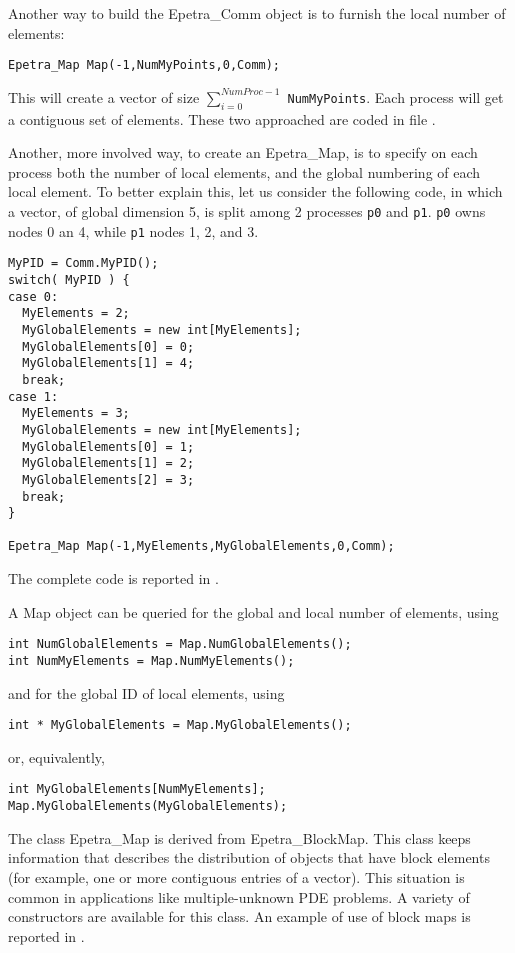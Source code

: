 Another way to build the Epetra\_Comm object is to furnish the local
number of elements:
\begin{verbatim}
Epetra_Map Map(-1,NumMyPoints,0,Comm);
\end{verbatim}
This will create a vector of size $\sum_{i=0}^{NumProc-1}$
\verb!NumMyPoints!. Each process will get a contiguous set of elements.
These two approached are coded in file \newline {}.

Another, more involved way, to create an Epetra\_Map, is to specify on
each process both the number of local elements, and the global numbering
of each local element. To better explain this, let us consider the
following code, in which a vector, of global dimension 5, is split among
2 processes \verb!p0! and \verb!p1!. \verb!p0! owns nodes 0 an 4, while
\verb!p1! nodes 1, 2, and 3.
\begin{verbatim}
MyPID = Comm.MyPID();
switch( MyPID ) {
case 0:
  MyElements = 2;
  MyGlobalElements = new int[MyElements];
  MyGlobalElements[0] = 0;
  MyGlobalElements[1] = 4;
  break;
case 1:
  MyElements = 3;
  MyGlobalElements = new int[MyElements];
  MyGlobalElements[0] = 1;
  MyGlobalElements[1] = 2;
  MyGlobalElements[2] = 3;
  break;
}

Epetra_Map Map(-1,MyElements,MyGlobalElements,0,Comm);
\end{verbatim}
The complete code is reported in .

A Map object can be queried for the global and local number of elements,
using
\begin{verbatim}
int NumGlobalElements = Map.NumGlobalElements();
int NumMyElements = Map.NumMyElements();
\end{verbatim}
and for the global ID of local elements, using
\begin{verbatim}
int * MyGlobalElements = Map.MyGlobalElements();
\end{verbatim}
or, equivalently,
\begin{verbatim}
int MyGlobalElements[NumMyElements];
Map.MyGlobalElements(MyGlobalElements);
\end{verbatim}

\bigskip

The class Epetra\_Map is derived from Epetra\_BlockMap. This class keeps
information that describes the distribution of objects that have block
elements (for example, one or more contiguous entries of a vector). This
situation is common in applications like multiple-unknown PDE problems.
A variety of constructors are available for this class. An example of
use of block maps is reported in .

